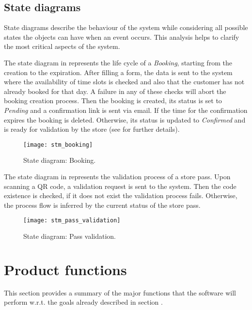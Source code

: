 \clearpage

\subsection{State diagrams}
State diagrams describe the behaviour of the system while considering all possible states the objects can have when an event occurs. This analysis helps to clarify the most critical aspects of the system.

The state diagram in  represents the life cycle of a \textit{Booking}, starting from the creation to the expiration.\newline
After filling a form, the data is sent to the system where the availability of time slots is checked and also that the customer has not already booked for that day. A failure in any of these checks will abort the booking creation process.\newline
Then the booking is created, its status is set to \textit{Pending} and a confirmation link is sent via email. If the time for the confirmation expires the booking is deleted.\newline
Otherwise, its status is updated to \textit{Confirmed} and is ready for validation by the store (see  for further details).

\begin{figure}[H]
	\centering
	\texttt{[image: stm\_booking]}
	\caption{State diagram: Booking.}
	\label{fig:stm_booking}
\end{figure}

The state diagram in  represents the validation process of a store pass.\newline
Upon scanning a QR code, a validation request is sent to the system. Then the code existence is checked, if it does not exist the validation process fails. Otherwise, the process flow is inferred by the current status of the store pass.

\begin{figure}[H]
	\centering
	\texttt{[image: stm\_pass\_validation]}
	\caption{State diagram: Pass validation.}
	\label{fig:stm_pass_validation}
\end{figure}


\section{Product functions}\label{desc:prodFunc}
This section provides a summary of the major functions that the software will perform w.r.t. the goals already described in section .

